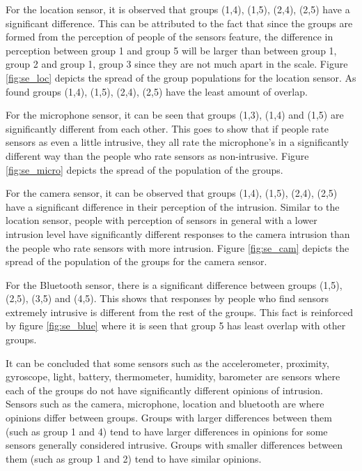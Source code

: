 For the location sensor, it is observed that groups (1,4), (1,5), (2,4), (2,5) have a significant difference. This can be attributed to the fact that since the groups are formed from the perception of people of the sensors feature, the difference in perception between group 1 and group 5 will be larger than between group 1, group 2 and group 1, group 3 since they are not much apart in the scale. Figure \ref{fig:se_loc} depicts the spread of the group populations for the location sensor. As found groups (1,4), (1,5), (2,4), (2,5) have the least amount of overlap.

For the microphone sensor, it can be seen that groups (1,3), (1,4) and (1,5) are significantly different from each other. This goes to show that
if people rate sensors as even a little intrusive, they all rate the microphone's in a significantly different way than the people who rate sensors as non-intrusive. Figure \ref{fig:se_micro} depicts the spread of the population of the groups.

For the camera sensor, it can be observed that groups (1,4), (1,5), (2,4), (2,5) have a significant difference in their perception of the intrusion. Similar to the location sensor, people with perception of sensors in general with a lower intrusion level have significantly different responses to the camera intrusion than the people who rate sensors with more intrusion. Figure \ref{fig:se_cam} depicts the spread of the population of the groups for the camera sensor.

For the Bluetooth sensor, there is a significant difference between groups (1,5), (2,5), (3,5) and (4,5). This shows that responses by people who find sensors extremely intrusive is different from the rest of the groups. This fact is reinforced by figure \ref{fig:se_blue} where it is seen that group 5 has least overlap with other groups.

It can be concluded that some sensors such as the accelerometer, proximity, gyroscope, light, battery, thermometer, humidity, barometer are sensors where each of the groups do not have significantly different opinions of intrusion. Sensors such as the camera, microphone, location and bluetooth
are where opinions differ between groups. Groups with larger differences between them (such as group 1 and 4) tend to have larger differences in opinions for some sensors generally considered intrusive. Groups with smaller differences between them (such as group 1 and 2) tend to have similar opinions. 


